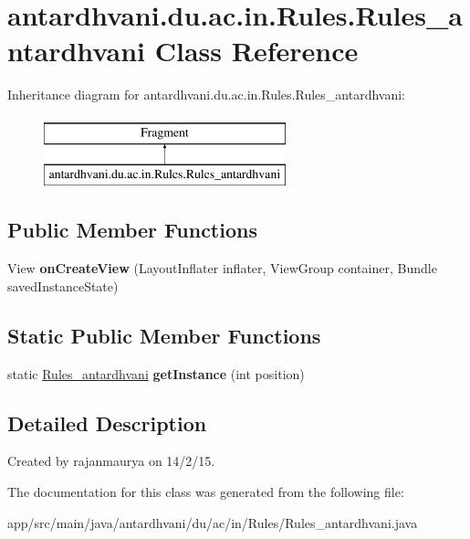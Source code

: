 \hypertarget{classantardhvani_1_1du_1_1ac_1_1in_1_1_rules_1_1_rules__antardhvani}{}\section{antardhvani.\+du.\+ac.\+in.\+Rules.\+Rules\+\_\+antardhvani Class Reference}
\label{classantardhvani_1_1du_1_1ac_1_1in_1_1_rules_1_1_rules__antardhvani}
Inheritance diagram for antardhvani.\+du.\+ac.\+in.\+Rules.\+Rules\+\_\+antardhvani\+:\begin{figure}[H]
\begin{center}
\leavevmode
\includegraphics[height=2.000000cm]{classantardhvani_1_1du_1_1ac_1_1in_1_1_rules_1_1_rules__antardhvani}
\end{center}
\end{figure}
\subsection*{Public Member Functions}
\begin{DoxyCompactItemize}
\item 
\hypertarget{classantardhvani_1_1du_1_1ac_1_1in_1_1_rules_1_1_rules__antardhvani_ae046449de14cd61ffc1308f8d04832cd}{}View {\bfseries on\+Create\+View} (Layout\+Inflater inflater, View\+Group container, Bundle saved\+Instance\+State)\label{classantardhvani_1_1du_1_1ac_1_1in_1_1_rules_1_1_rules__antardhvani_ae046449de14cd61ffc1308f8d04832cd}

\end{DoxyCompactItemize}
\subsection*{Static Public Member Functions}
\begin{DoxyCompactItemize}
\item 
\hypertarget{classantardhvani_1_1du_1_1ac_1_1in_1_1_rules_1_1_rules__antardhvani_a9626ba42511ceb9c1a023d7f224f61f8}{}static \hyperlink{classantardhvani_1_1du_1_1ac_1_1in_1_1_rules_1_1_rules__antardhvani}{Rules\+\_\+antardhvani} {\bfseries get\+Instance} (int position)\label{classantardhvani_1_1du_1_1ac_1_1in_1_1_rules_1_1_rules__antardhvani_a9626ba42511ceb9c1a023d7f224f61f8}

\end{DoxyCompactItemize}


\subsection{Detailed Description}
Created by rajanmaurya on 14/2/15. 

The documentation for this class was generated from the following file\+:\begin{DoxyCompactItemize}
\item 
app/src/main/java/antardhvani/du/ac/in/\+Rules/Rules\+\_\+antardhvani.\+java\end{DoxyCompactItemize}
